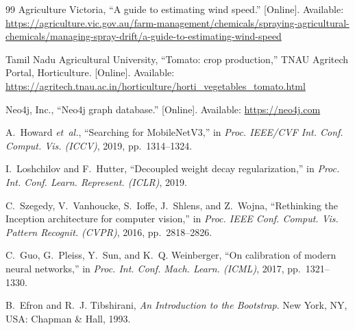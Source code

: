 \documentclass[conference]{IEEEtran}
\begin{document}
\begin{thebibliography}{99}
Agriculture Victoria, ``A guide to estimating wind speed.'' [Online]. Available: \url{https://agriculture.vic.gov.au/farm-management/chemicals/spraying-agricultural-chemicals/managing-spray-drift/a-guide-to-estimating-wind-speed}

Tamil Nadu Agricultural University, ``Tomato: crop production,'' TNAU Agritech Portal, Horticulture. [Online]. Available: \url{https://agritech.tnau.ac.in/horticulture/horti_vegetables_tomato.html}

Neo4j, Inc., ``Neo4j graph database.'' [Online]. Available: \url{https://neo4j.com}

A.~Howard \emph{et~al.}, ``Searching for MobileNetV3,'' in \emph{Proc. IEEE/CVF Int. Conf. Comput. Vis. (ICCV)}, 2019, pp.~1314--1324.

I.~Loshchilov and F.~Hutter, ``Decoupled weight decay regularization,'' in \emph{Proc. Int. Conf. Learn. Represent. (ICLR)}, 2019.

C.~Szegedy, V.~Vanhoucke, S.~Ioffe, J.~Shlens, and Z.~Wojna, ``Rethinking the Inception architecture for computer vision,'' in \emph{Proc. IEEE Conf. Comput. Vis. Pattern Recognit. (CVPR)}, 2016, pp.~2818--2826.

C.~Guo, G.~Pleiss, Y.~Sun, and K.~Q. Weinberger, ``On calibration of modern neural networks,'' in \emph{Proc. Int. Conf. Mach. Learn. (ICML)}, 2017, pp.~1321--1330.

B.~Efron and R.~J. Tibshirani, \emph{An Introduction to the Bootstrap}. New York, NY, USA: Chapman \& Hall, 1993.

\end{thebibliography}
\end{document}
